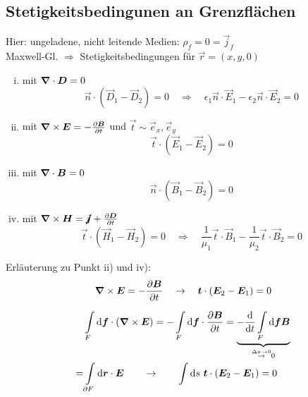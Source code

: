 \subsection{Stetigkeitsbedingunen an Grenzflächen}

Hier: ungeladene, nicht leitende Medien: $ \rho_f = 0 = \vec{j}_f $\\[5pt]
Maxwell-Gl. $ \Rightarrow $ Stetigkeitsbedingungen für $ \vec{r} = (x,y,0) $
\begin{enumerate}[i)]
	\item mit $ \bm{\nabla} \cdot \bm{D} = 0 $
	\begin{equation*}
	\vec{n} \cdot (\vec{D}_1 - \vec{D}_2) = 0 \quad \Rightarrow \quad \epsilon_1 \vec{n} \cdot \vec{E}_1 - \epsilon_2 \vec{n} \cdot \vec{E}_2 = 0
	\end{equation*}
	\item mit $ \bm{\nabla} \times \bm{E} = - \frac{\partial \bm{B}}{\partial t} $ und $ \vec{t} \sim \vec{e}_x, \vec{e}_y $
	\begin{equation*}
	\vec{t} \cdot (\vec{E}_1 - \vec{E}_2) = 0
	\end{equation*}
	\item mit $ \bm{\nabla} \cdot \bm{B} = 0 $
	\begin{equation*}
	\vec{n} \cdot (\vec{B}_1 - \vec{B}_2) = 0
	\end{equation*}
	\item mit $ \bm{\nabla} \times \bm{H} = \cancel{\bm{j}} + \frac{\partial \bm{D}}{\partial t} $
	\begin{equation*}
	\vec{t} \cdot (\vec{H}_1 - \vec{H}_2) = 0 \quad \Rightarrow \quad \frac{1}{\mu_1} \vec{t} \cdot \vec{B}_1 - \frac{1}{\mu_2} \vec{t} \cdot \vec{B}_2 = 0
	\end{equation*}
\end{enumerate}
Erläuterung zu Punkt ii) und iv):
\begin{equation*}
\bm{\nabla} \times \bm{E} = - \frac{\partial \bm{B}}{\partial t} \quad \rightarrow \quad \bm{t} \cdot (\bm{E}_2 - \bm{E}_1) = 0
\end{equation*}
\begin{minipage}{.6\linewidth}
	\begin{align*}
	&\int \limits _F \textrm{d} \bm{f} \cdot (\bm{\nabla} \times \bm{E}) = - \int \limits_F \textrm{d} \bm{f} \cdot \frac{\partial \bm{B}}{\partial t} = \underbrace{- \frac{\textrm{d} }{\textrm{d} t} \int \limits_F \textrm{d} \bm{f} \bm{B}}_{\overset{\Delta x \to 0}{\rightarrow} 0} \\
	= & \int \limits_{\partial F} \textrm{d} \bm{r} \cdot \bm{E} \qquad \rightarrow \qquad \int \textrm{d} s \ \bm{t} \cdot (\bm{E}_2 - \bm{E}_1) = 0
	\end{align*}
	\vspace{5pt}
\end{minipage}%
